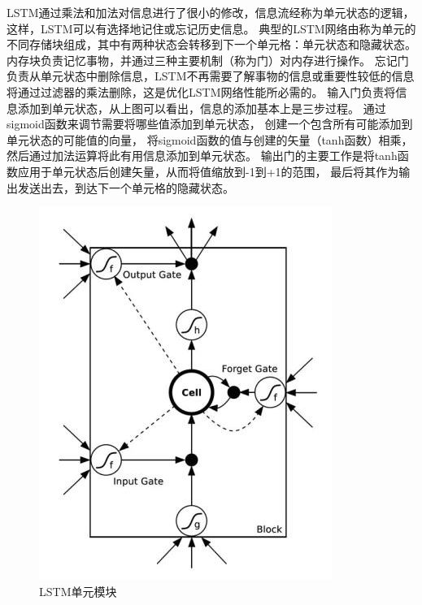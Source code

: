   LSTM通过乘法和加法对信息进行了很小的修改，信息流经称为单元状态的逻辑，这样，LSTM可以有选择地记住或忘记历史信息。
  典型的LSTM网络由称为单元的不同存储块组成，其中有两种状态会转移到下一个单元格：单元状态和隐藏状态。
  内存块负责记忆事物，并通过三种主要机制（称为门）对内存进行操作。
  忘记门负责从单元状态中删除信息，LSTM不再需要了解事物的信息或重要性较低的信息将通过过滤器的乘法删除，这是优化LSTM网络性能所必需的。
  输入门负责将信息添加到单元状态，从上图可以看出，信息的添加基本上是三步过程。
  通过sigmoid函数来调节需要将哪些值添加到单元状态， 
  创建一个包含所有可能添加到单元状态的可能值的向量， 
  将sigmoid函数的值与创建的矢量（tanh函数）相乘，然后通过加法运算将此有用信息添加到单元状态。
  输出门的主要工作是将tanh函数应用于单元状态后创建矢量，从而将值缩放到-1到+1的范围， 
最后将其作为输出发送出去，到达下一个单元格的隐藏状态。
  
  \begin{figure}[htbp]
    \centering
    \includegraphics[scale=0.5]{./images/LSTM.jpg}
    \caption{LSTM单元模块\cite{sundermeyer2012lstm}}
    \label{fig:LSTM}
  \end{figure}
  

